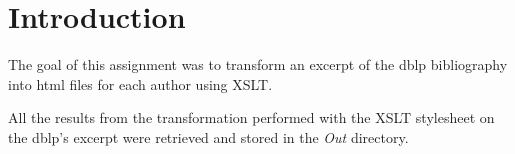 \section{Introduction}

The goal of this assignment was to transform an excerpt of the dblp bibliography
into html files for each author using XSLT.

\begin{framehint}
    All the results from the transformation performed with the XSLT stylesheet
    on the dblp's excerpt were retrieved and stored in the \emph{Out} directory.
\end{framehint}
